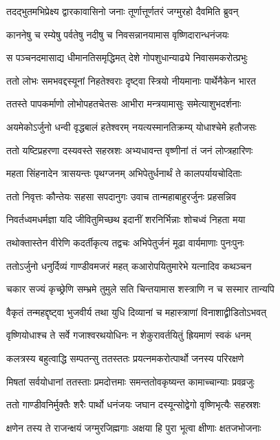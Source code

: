 \twolineshloka
{तदद्भुतमभिप्रेक्ष्य द्वारकावासिनो जनाः}
{तूर्णात्तूर्णतरं जग्मुरहो दैवमिति ब्रुवन्}


\twolineshloka
{काननेषु च रम्येषु पर्वतेषु नदीषु च}
{निवसन्नानयामास वृष्णिदारान्धनंजयः}


\twolineshloka
{स पञ्चनदमासाद्य धीमानतिसमृद्धिमत्}
{देशे गोपशुधान्याढ्ये निवासमकरोत्प्रभुः}


\twolineshloka
{ततो लोभः समभवद्दस्यूनां निहतेश्वराः}
{दृष्ट्वा स्त्रियो नीयमानाः पार्थेनैकेन भारत}


\twolineshloka
{ततस्ते पापकर्माणो लोभोपहतचेतसः}
{आभीरा मन्त्रयामासुः समेत्याशुभदर्शनाः}


\twolineshloka
{अयमेकोऽर्जुनो धन्वी वृद्धबालं हतेश्वरम्}
{नयत्यस्मानतिक्रम्य् योधाश्चेमे हतौजसः}


\twolineshloka
{ततो यष्टिप्रहरणा दस्यवस्ते सहस्रशः}
{अभ्यधावन्त वृष्णीनां तं जनं लोप्त्रहारिणः}


\twolineshloka
{महता सिंहनादेन त्रासयन्तः पृथग्जनम्}
{अभिपेतुर्धनार्थं ते कालपर्यायचोदिताः}


\twolineshloka
{ततो निवृत्तः कौन्तेयः सहसा सपदानुगः}
{उवाच तान्महाबाहुरर्जुनः प्रहसन्निव}


\twolineshloka
{निवर्तध्वमधर्मज्ञा यदि जीवितुमिच्छथ}
{इदानीं शरनिर्भिन्नाः शोचध्वं निहता मया}


\twolineshloka
{तथोक्तास्तेन वीरेणि कदर्तीकृत्य तद्वचः}
{अभिपेतुर्जनं मूढा वार्यमाणाः पुनःपुनः}


\twolineshloka
{ततोऽर्जुनो धनुर्दिव्यं गाण्डीवमजरं महत्}
{कआरोपयितुमारेभे यत्नादिव कथञ्चन}


\twolineshloka
{चकार सज्यं कृच्छ्रेणि सम्भ्रमे तुमुले सति}
{चिन्तयामास शस्त्राणि न च सस्मार तान्यपि}


\twolineshloka
{वैकृतं तन्महद्दृष्ट्वा भुजवीर्य तथा युधि}
{दिव्यानां च महास्त्राणां विनाशाद्व्रीडितोऽभवत्}


\twolineshloka
{वृष्णियोधाश्च ते सर्वे गजाश्वरथयोधिनः}
{न शेकुरावर्तयितुं ह्रियमाणं स्वकं धनम्}


\twolineshloka
{कलत्रस्य बहुत्वाद्धि सम्पतन्सु ततस्ततः}
{प्रयत्नमकरोत्पार्थो जनस्य परिरक्षणे}


\twolineshloka
{मिषतां सर्वयोधानां ततस्ताः प्रमदोत्तमाः}
{समन्ततोवकृष्यन्त कामाच्चान्याः प्रवव्रजुः}


\twolineshloka
{ततो गाण्डीवनिर्मुक्तैः शरैः पार्थो धनंजयः}
{जघान दस्यून्सोद्वेगो वृष्णिभृत्यैः सहस्रशः}


\twolineshloka
{क्षणेन तस्य ते राजन्क्षयं जग्मुरजिह्मगाः}
{अक्षया हि पुरा भूत्वा क्षीणाः क्षतजभोजनाः}


